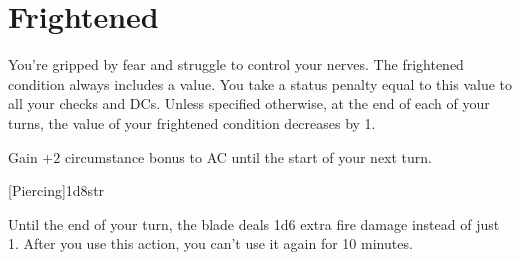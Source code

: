 \documentclass[paper=63mm:88mm, DIV=21, fontsize=7.5pt]{scrartcl}
\begin{document}
\section{Frightened}

You're gripped by fear and struggle to control your nerves.
The frightened condition always includes a value.
You take a status penalty equal to this value to all your checks and DCs.
Unless specified otherwise, at the end of each of your turns, the value of your frightened condition decreases by 1.






Gain \(+2\) circumstance bonus to AC until the start of your next turn.









[Piercing]{1d8}{str}



Until the end of your turn, the blade deals 1d6 extra fire damage instead of just 1. After you use this action, you can't use it again for 10 minutes.

\vfill

\end{document}
